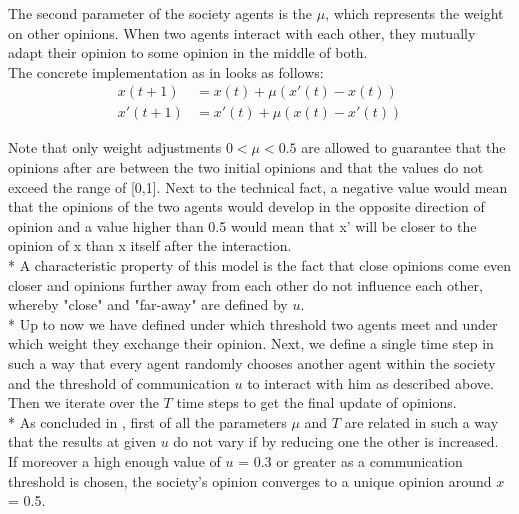 \documentclass[11pt]{article}
\begin{document}
The second parameter of the society agents is the $\mu$, which represents the weight on other opinions. When two agents interact with each other, they mutually adapt their opinion to some opinion in the middle of both. \\

The concrete implementation as in \cite{Minor} looks as follows:
\begin{equation}
\begin{aligned}
x(t+1) &= x(t) + \mu(x'(t) - x(t))  \\
x'(t+1) &= x'(t) + \mu(x(t) - x'(t)) 
\end{aligned}
\end{equation}

Note that only weight adjustments $0 < \mu < 0.5$ are allowed to guarantee that the opinions after are between the two initial opinions and that the values do not exceed the range of [0,1]. Next to the technical fact, a negative value would mean that the opinions of the two agents would develop in the opposite direction of opinion and a value higher than 0.5 would mean that x' will be closer to the opinion of x than x itself after the interaction. \\*
A characteristic property of this model is the fact that close opinions come even closer and opinions further away from each other do not influence each other, whereby "close" and "far-away" are defined by $u$. \\*
Up to now we have defined under which threshold two agents meet and under which weight they exchange their opinion. Next, we define a single time step in such a way that every agent randomly chooses another agent within the society and the threshold of communication $u$ to interact with him as described above. Then we iterate over the $T$ time steps to get the final update of opinions. \\*
As concluded in \cite{Minor}, first of all the parameters $\mu$ and $T$ are related in such a way that the results at given $u$ do not vary if by reducing one the other is increased. If moreover a high enough value of $u$ = 0.3 or greater as a communication threshold is chosen, the society's opinion converges to a unique opinion around $x$ = 0.5.
\end{document}
